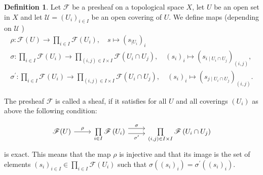\documentclass[12pt,a4paper]{book}
\theoremstyle{definition}
\newtheorem{defn}{Definition}[section]
\begin{document}
\begin{defn}
    Let $\mathscr{F}$ be a presheaf on a topological space $X$, let $U$ be an open set in $X$ and let $\mathscr{U}=\left(U_i\right)_{i \in I}$ be an open covering of $U$. We define maps (depending on $\mathscr{U}$ )
    $$
        \begin{gathered}
            \rho: \mathscr{F}(U) \rightarrow \prod_{i \in I} \mathscr{F}\left(U_i\right), \quad s \mapsto\left(s_{\mid U_i}\right)_i \\
            \sigma: \prod_{i \in I} \mathscr{F}\left(U_i\right) \rightarrow \prod_{(i, j) \in I \times I} \mathscr{F}\left(U_i \cap U_j\right), \quad\left(s_i\right)_i \mapsto\left(s_{i \mid U_i \cap U_j}\right)_{(i, j)}, \\
            \sigma^{\prime}: \prod_{i \in I} \mathscr{F}\left(U_i\right) \rightarrow \prod_{(i, j) \in I \times I} \mathscr{F}\left(U_i \cap U_j\right), \quad\left(s_i\right)_i \mapsto\left(s_{j \mid U_i \cap U_j}\right)_{(i, j)} .
        \end{gathered}
    $$

    The presheaf $\mathscr{F}$ is called a sheaf, if it satisfies for all $U$ and all coverings $\left(U_i\right)$ as above the following condition:

    \[\begin{tikzcd}
            { \mathscr{F}(U) } & {\prod\limits_{i \in I} \mathscr{F}\left(U_i\right)} & {\prod\limits_{(i, j) \in I \times I} \mathscr{F}\left(U_i \cap U_j\right)}
            \arrow["\rho", from=1-1, to=1-2]
            \arrow["\sigma", shift left=2, from=1-2, to=1-3]
            \arrow["{\sigma^{\prime}}"', shift right, from=1-2, to=1-3]
        \end{tikzcd}\]
    is exact. This means that the map $\rho$ is injective and that its image is the set of elements $\left(s_i\right)_{i \in I} \in \prod_{i \in I} \mathscr{F}\left(U_i\right)$ such that $\sigma\left(\left(s_i\right)_i\right)=\sigma^{\prime}\left(\left(s_i\right)_i\right)$.


\end{defn}
\end{document}
